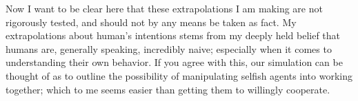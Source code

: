 \documentclass[conference]{IEEEtran}
\begin{document}
Now I want to be clear here that these extrapolations I am making are not rigorously tested, and should not by any means be taken as fact. My extrapolations about human's intentions stems from my deeply held belief that humans are, generally speaking, incredibly naive; especially when it comes to understanding their own behavior. If you agree with this, our simulation can be thought of as to outline the possibility of manipulating selfish agents into working together; which to me seems easier than getting them to willingly cooperate. 

%
%



%
%
\end{document}
